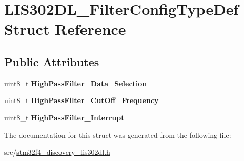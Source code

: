 \hypertarget{struct_l_i_s302_d_l___filter_config_type_def}{\section{L\-I\-S302\-D\-L\-\_\-\-Filter\-Config\-Type\-Def Struct Reference}
\label{struct_l_i_s302_d_l___filter_config_type_def}
}
\subsection*{Public Attributes}
\begin{DoxyCompactItemize}
\item 
\hypertarget{struct_l_i_s302_d_l___filter_config_type_def_aa2e8aedabf7f8913e116ca54b594412a}{uint8\-\_\-t {\bfseries High\-Pass\-Filter\-\_\-\-Data\-\_\-\-Selection}}\label{struct_l_i_s302_d_l___filter_config_type_def_aa2e8aedabf7f8913e116ca54b594412a}

\item 
\hypertarget{struct_l_i_s302_d_l___filter_config_type_def_a1db207b4e1eedf015a427436235ade0b}{uint8\-\_\-t {\bfseries High\-Pass\-Filter\-\_\-\-Cut\-Off\-\_\-\-Frequency}}\label{struct_l_i_s302_d_l___filter_config_type_def_a1db207b4e1eedf015a427436235ade0b}

\item 
\hypertarget{struct_l_i_s302_d_l___filter_config_type_def_aaaac36f8fbab43a09fc379b24d5d8578}{uint8\-\_\-t {\bfseries High\-Pass\-Filter\-\_\-\-Interrupt}}\label{struct_l_i_s302_d_l___filter_config_type_def_aaaac36f8fbab43a09fc379b24d5d8578}

\end{DoxyCompactItemize}


The documentation for this struct was generated from the following file\-:\begin{DoxyCompactItemize}
\item 
src/\hyperlink{stm32f4__discovery__lis302dl_8h}{stm32f4\-\_\-discovery\-\_\-lis302dl.\-h}\end{DoxyCompactItemize}
